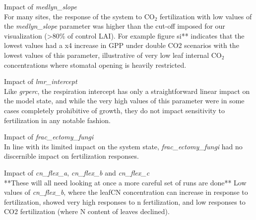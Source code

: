 \documentclass[draft,linenumbers]{agujournal}
\begin{document}
Impact of \emph{medlyn\_slope}\\
For many sites, the response of the system to CO$_{2}$ fertilization with low values of the \emph{medlyn\_slope} parameter was higher than the cut-off imposed for our visualization (>80\% of control LAI). For example figure si** indicates that the lowest values had a x4 increase in GPP under double CO2 scenarios with the lowest values of this parameter, illustrative of very low leaf internal CO$_{2}$ concentrations where stomatal opening is heavily restricted.

Impact of \emph{lmr\_intercept}\\
Like \emph{grperc}, the respiration intercept has only a straightforward linear impact on the model state, and while the very high values of this parameter were in some cases completely prohibitive of growth, they do not impact sensitivity to fertilization in any notable fashion. 

Impact of \emph{frac\_ectomy\_fungi}\\
In line with its limited impact on the system state, \emph{frac\_ectomy\_fungi} had no discernible impact on fertilization responses. 

Impact of \emph{cn\_flex\_a},  \emph{cn\_flex\_b} and \emph{cn\_flex\_c}\\
**These will all need looking at once a more careful set of runs are done**
Low values of \emph{cn\_flex\_b}, where the leafCN concentration can increase in response to fertilization, showed very high responses to n fertilization, and low responses to CO2 fertilization (where N content of leaves declined). 
\end{document}
